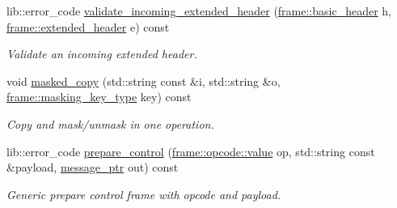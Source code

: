 \begin{DoxyCompactItemize}
lib\+::error\+\_\+code \hyperlink{classwebsocketpp_1_1processor_1_1hybi13_af6218c464ee04b8c92731e3dcc3421b9}{validate\+\_\+incoming\+\_\+extended\+\_\+header} (\hyperlink{structwebsocketpp_1_1frame_1_1basic__header}{frame\+::basic\+\_\+header} h, \hyperlink{structwebsocketpp_1_1frame_1_1extended__header}{frame\+::extended\+\_\+header} e) const 
\begin{DoxyCompactList}\small\item\em Validate an incoming extended header. \end{DoxyCompactList}\item 
void \hyperlink{classwebsocketpp_1_1processor_1_1hybi13_a327b03851fb6db8788f567cf26ceebff}{masked\+\_\+copy} (std\+::string const \&i, std\+::string \&o, \hyperlink{namespacewebsocketpp_1_1frame_a8bdac8ec44c78c027fcf55aa3bad3f86}{frame\+::masking\+\_\+key\+\_\+type} key) const 
\begin{DoxyCompactList}\small\item\em Copy and mask/unmask in one operation. \end{DoxyCompactList}\item 
lib\+::error\+\_\+code \hyperlink{classwebsocketpp_1_1processor_1_1hybi13_a5f7c3aa5674eca99fbac7dfcd6e9e1f9}{prepare\+\_\+control} (\hyperlink{namespacewebsocketpp_1_1frame_1_1opcode_ae68711643096dfc4af6d66ade3f9fd5e}{frame\+::opcode\+::value} op, std\+::string const \&payload, \hyperlink{classwebsocketpp_1_1processor_1_1hybi13_a0571e90d7261ab722f695feb7dd48fed}{message\+\_\+ptr} out) const 
\begin{DoxyCompactList}\small\item\em Generic prepare control frame with opcode and payload. \end{DoxyCompactList}\end{DoxyCompactItemize}
